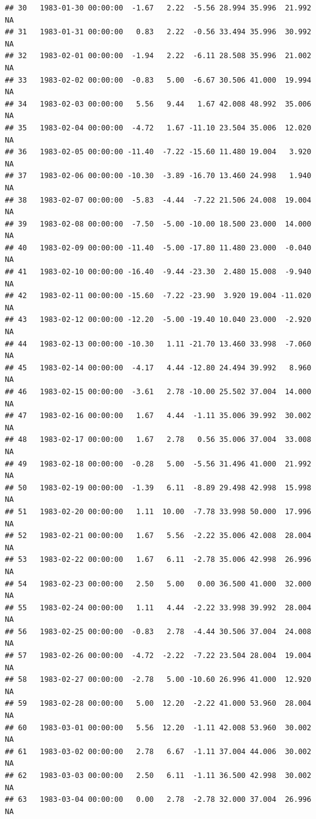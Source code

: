 \documentclass{article}\usepackage{graphicx, color}
\makeatletter
\newenvironment{kframe}{%
 \def\at@end@of@kframe{}%
 \ifinner\ifhmode%
  \def\at@end@of@kframe{\end{minipage}}%
  \begin{minipage}{\columnwidth}%
 \fi\fi%
 \def\FrameCommand##1{\hskip\@totalleftmargin \hskip-\fboxsep
 \colorbox{shadecolor}{##1}\hskip-\fboxsep
     \hskip-\linewidth \hskip-\@totalleftmargin \hskip\columnwidth}%
 \MakeFramed {\advance\hsize-\width
   \@totalleftmargin\z@ \linewidth\hsize
   \@setminipage}}%
 {\par\unskip\endMakeFramed%
 \at@end@of@kframe}
\newenvironment{knitrout}{}{} %
\makeatother
\begin{document}
\begin{knitrout}
\begin{kframe}
\begin{verbatim}
## 30   1983-01-30 00:00:00  -1.67   2.22  -5.56 28.994 35.996  21.992     NA
## 31   1983-01-31 00:00:00   0.83   2.22  -0.56 33.494 35.996  30.992     NA
## 32   1983-02-01 00:00:00  -1.94   2.22  -6.11 28.508 35.996  21.002     NA
## 33   1983-02-02 00:00:00  -0.83   5.00  -6.67 30.506 41.000  19.994     NA
## 34   1983-02-03 00:00:00   5.56   9.44   1.67 42.008 48.992  35.006     NA
## 35   1983-02-04 00:00:00  -4.72   1.67 -11.10 23.504 35.006  12.020     NA
## 36   1983-02-05 00:00:00 -11.40  -7.22 -15.60 11.480 19.004   3.920     NA
## 37   1983-02-06 00:00:00 -10.30  -3.89 -16.70 13.460 24.998   1.940     NA
## 38   1983-02-07 00:00:00  -5.83  -4.44  -7.22 21.506 24.008  19.004     NA
## 39   1983-02-08 00:00:00  -7.50  -5.00 -10.00 18.500 23.000  14.000     NA
## 40   1983-02-09 00:00:00 -11.40  -5.00 -17.80 11.480 23.000  -0.040     NA
## 41   1983-02-10 00:00:00 -16.40  -9.44 -23.30  2.480 15.008  -9.940     NA
## 42   1983-02-11 00:00:00 -15.60  -7.22 -23.90  3.920 19.004 -11.020     NA
## 43   1983-02-12 00:00:00 -12.20  -5.00 -19.40 10.040 23.000  -2.920     NA
## 44   1983-02-13 00:00:00 -10.30   1.11 -21.70 13.460 33.998  -7.060     NA
## 45   1983-02-14 00:00:00  -4.17   4.44 -12.80 24.494 39.992   8.960     NA
## 46   1983-02-15 00:00:00  -3.61   2.78 -10.00 25.502 37.004  14.000     NA
## 47   1983-02-16 00:00:00   1.67   4.44  -1.11 35.006 39.992  30.002     NA
## 48   1983-02-17 00:00:00   1.67   2.78   0.56 35.006 37.004  33.008     NA
## 49   1983-02-18 00:00:00  -0.28   5.00  -5.56 31.496 41.000  21.992     NA
## 50   1983-02-19 00:00:00  -1.39   6.11  -8.89 29.498 42.998  15.998     NA
## 51   1983-02-20 00:00:00   1.11  10.00  -7.78 33.998 50.000  17.996     NA
## 52   1983-02-21 00:00:00   1.67   5.56  -2.22 35.006 42.008  28.004     NA
## 53   1983-02-22 00:00:00   1.67   6.11  -2.78 35.006 42.998  26.996     NA
## 54   1983-02-23 00:00:00   2.50   5.00   0.00 36.500 41.000  32.000     NA
## 55   1983-02-24 00:00:00   1.11   4.44  -2.22 33.998 39.992  28.004     NA
## 56   1983-02-25 00:00:00  -0.83   2.78  -4.44 30.506 37.004  24.008     NA
## 57   1983-02-26 00:00:00  -4.72  -2.22  -7.22 23.504 28.004  19.004     NA
## 58   1983-02-27 00:00:00  -2.78   5.00 -10.60 26.996 41.000  12.920     NA
## 59   1983-02-28 00:00:00   5.00  12.20  -2.22 41.000 53.960  28.004     NA
## 60   1983-03-01 00:00:00   5.56  12.20  -1.11 42.008 53.960  30.002     NA
## 61   1983-03-02 00:00:00   2.78   6.67  -1.11 37.004 44.006  30.002     NA
## 62   1983-03-03 00:00:00   2.50   6.11  -1.11 36.500 42.998  30.002     NA
## 63   1983-03-04 00:00:00   0.00   2.78  -2.78 32.000 37.004  26.996     NA

\end{verbatim}
\end{kframe}
\end{knitrout}
\end{document}
